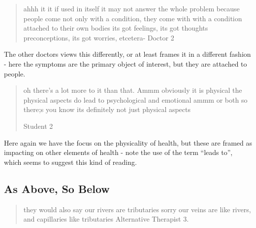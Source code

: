 \begin{quotation}
  ahhh it it if used in itself it may not answer the whole problem because people come not only with a condition, they come with with a condition attached to their own bodies its got feelings, its got thoughts preconceptions, its got worries, etcetera-
Doctor 2
\end{quotation}


The other doctors views this differently, or at least frames it in a different fashion - here the symptoms are the primary object of interest, but they are attached to people. 

\begin{quotation}
  oh there's a lot more to it than that. Ammm obviously it is physical the physical aspects do lead to psychological and emotional ammm or both so there;s you know its definitely not just physical aspects 

Student 2
\end{quotation}

Here again we have the focus on the physicality of health, but these are framed as impacting on other elements of health - note the use of the term ``leads to'', which seems to suggest this kind of reading. 


\subsection{As Above, So Below}
\label{sec:as-above-so}

\begin{quotation}
  they would also say our rivers are tributaries sorry our veins are like rivers, and capillaries like tributaries 
Alternative Therapist 3. 
\end{quotation}

